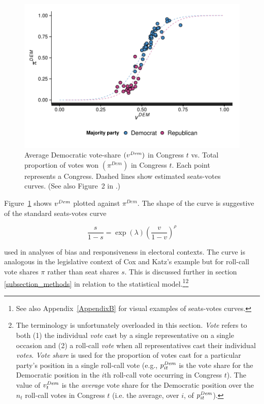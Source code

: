 \begin{figure}
\centering
	\includegraphics[scale=0.75]{sections/figs/vdem_vs_pdem}
\caption{Average Democratic vote-share $(v^{\it Dem})$ in Congress $t$ vs. Total proportion of votes won $(\pi^{Dem})$ in Congress $t$. Each point represents a Congress. Dashed lines show estimated seats-votes curves. (See also Figure~2 in \protect{}.)}
\label{fig:log_vratio_vs_ptdem}
\end{figure}


Figure~\ref{fig:log_vratio_vs_ptdem} shows $v^{\it Dem}$ plotted against $\pi^{Dem}$. The shape of the curve is suggestive of the standard seats-votes curve  

\begin{equation*}
 \frac{s}{1-s} = \exp{(\lambda)}\left(\frac{v}{1-v}\right)^\rho 
\end{equation*}

\noindent used in analyses of bias and responsiveness in electoral contexts. The curve is 
analogous in the legislative context of Cox and Katz's example but for roll-call vote shares 
$\pi$ rather than seat shares $s$. This is discussed further in section \ref{subsection_methods}
 in relation to the statistical model.\footnote{See also Appendix~\ref{AppendixB} for visual 
 examples of seats-votes curves.}\footnote{
The terminology is unfortunately overloaded in this section. {\it Vote} refers to both (1) the individual 
{\it vote} cast by a single representative on a single occasion and (2) a roll-call {\it vote} when
all representatives cast their individual {\it votes}. {\it Vote share} is used for the proportion of
votes cast for a particular party's position in a single roll-call vote (e.g., $p^{\it Dem}_{it}$ is the 
vote share for the Democratic position in the $i$th roll-call vote occurring in Congress $t$). The 
value of $v_t^{\it Dem}$ is the {\it average} vote share for the Democratic position over the $n_t$ roll-call votes in Congress $t$ (i.e. the average, over $i$, of $p^{\it Dem}_{it}$). }  

